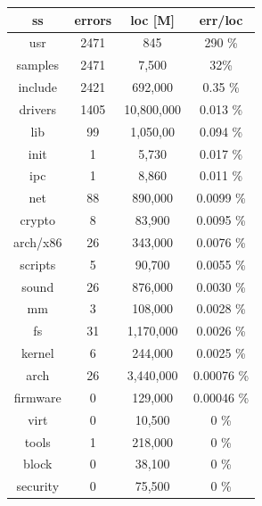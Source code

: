 \documentclass[a4paper,11pt]{report}
\newcommand{\figa}{
    \begin{figure}[!htpb]
    \centering
}
\newcommand{\figb}[2]{
    \caption{#1}
    \label{#2}
    \end{figure}
}
\begin{document}
\figa
    \begin{tabular}{c|c|c|c}
        \hline
        \hline
        ss     & errors  & loc [M]     & err/loc \\
        \hline 
        usr     & 2471    & 845          & 290 \% \\
        samples & 2471    & 7,500        & 32\% \\
        include & 2421    & 692,000      & 0.35 \% \\
        drivers & 1405    & 10,800,000   & 0.013 \% \\
        lib     & 99      & 1,050,00     & 0.094 \% \\
        init    & 1       & 5,730        & 0.017 \% \\
        ipc     & 1       & 8,860        & 0.011 \% \\
        net     & 88      & 890,000      & 0.0099 \% \\
        crypto  & 8       & 83,900       & 0.0095 \% \\
        arch/x86 & 26     & 343,000      & 0.0076 \% \\
        scripts & 5       & 90,700       & 0.0055 \% \\
        sound   & 26      & 876,000      & 0.0030 \% \\
        mm      & 3       & 108,000      & 0.0028 \% \\
        fs      & 31      & 1,170,000    & 0.0026 \% \\
        kernel  & 6       & 244,000      & 0.0025 \% \\
        arch    & 26      & 3,440,000    & 0.00076 \% \\
        firmware & 0       & 129,000      & 0.00046 \% \\
        virt    & 0       & 10,500       & 0    \% \\
        tools   & 1       & 218,000      & 0    \% \\
        block   & 0       & 38,100       & 0    \% \\
        security & 0       & 75,500       & 0   \% \\
        \hline
        \hline
    \end{tabular}
\figb{}{}
\end{document}
